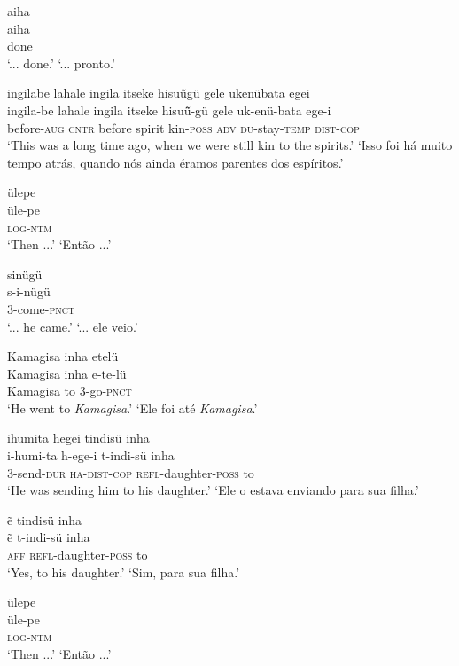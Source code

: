 \documentclass[output=paper,
modfonts,nonflat
]{langsci/langscibook}
\begin{document}
\ea  aiha\\[.3em]
\gll aiha\\
     done\\
\glt ‘... done.’
\glt ‘... pronto.’
\z

\ea  ingilabe lahale ingila itseke hisuü̃gü gele ukenübata egei\\[.3em]
\gll ingila-be lahale ingila itseke hisuü̃-gü gele uk-enü-bata ege-i\\
     before-\textsc{aug} \textsc{cntr} before spirit kin-\textsc{poss} \textsc{adv} \textsc{du}-stay-\textsc{temp} \textsc{dist}-\textsc{cop}\\
\glt ‘This was a long time ago, when we were still kin to the spirits.’
\glt ‘Isso foi há muito tempo atrás, quando nós ainda éramos parentes dos espíritos.’
\z

\ea  ülepe\\[.3em]
\gll üle-pe\\
     \textsc{log}-\textsc{ntm}\\
\glt ‘Then ...’
\glt ‘Então ...’
\z

\ea  sinügü\\[.3em]
\gll s-i-nügü\\
     3-come-\textsc{pnct}\\
\glt ‘... he came.’
\glt ‘... ele veio.’
\z

\ea  Kamagisa inha etelü\\[.3em]
\gll Kamagisa inha e-te-lü\\
     Kamagisa to 3-go-\textsc{pnct}\\
\glt ‘He went to \textit{Kamagisa}.’
\glt ‘Ele foi até \textit{Kamagisa}.’
\z

\ea  ihumita hegei tindisü inha\\[.3em]
\gll i-humi-ta h-ege-i t-indi-sü inha\\
     3-send-\textsc{dur} \textsc{ha}-\textsc{dist}-\textsc{cop} \textsc{refl}-daughter-\textsc{poss} to\\
\glt ‘He was sending him to his daughter.’
\glt ‘Ele o estava enviando para sua filha.’
\z

\ea  ẽ tindisü inha\\[.3em]
\gll ẽ t-indi-sü inha\\
     \textsc{aff} \textsc{refl}-daughter-\textsc{poss} to\\
\glt ‘Yes, to his daughter.’
\glt ‘Sim, para sua filha.’
\z

\ea  ülepe\\[.3em]
\gll üle-pe\\
     \textsc{log}-\textsc{ntm}\\
\glt ‘Then ...’
\glt ‘Então ...’
\z
\end{document}
